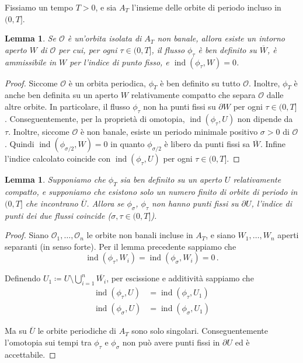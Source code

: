 \documentclass[a4paper, 11pt]{article}
\theoremstyle{definition}
\theoremstyle{plain}
\newtheorem{Lemma}[Def]{Lemma}
\newcommand{\OO}{\mathcal{O}}
\newcommand{\cl}[1]{\overline{#1}}
\newcommand{\deff}{\coloneqq}
\DeclareMathOperator{\ind}{ind}
\begin{document}
Fissiamo un tempo $T > 0$, e sia $A_T$ l'insieme delle orbite di periodo incluso in $(0,T]$.
\begin{Lemma}
	Se $\OO$ è un'orbita isolata di $A_T$ non banale, allora esiste un intorno aperto $W$ di $\OO$ per cui, per ogni $\tau \in (0,T]$, il flusso $\phi_\tau$ è ben definito su $\cl{W}$, è ammissibile in $W$ per l'indice di punto fisso, e $\ind(\phi_\tau,W) = 0$.
\end{Lemma}
\begin{proof}
	Siccome $\OO$ è un orbita periodica, $\phi_T$ è ben definito su tutto $\OO$. Inoltre, $\phi_T$ è anche ben definita su un aperto $W$ relativamente compatto che separa $\OO$ dalle altre orbite. In particolare, il flusso $\phi_\tau$ non ha punti fissi su $\partial W$ per ogni $\tau \in (0,T]$. Conseguentemente, per la proprietà di omotopia, $\ind(\phi_\tau,U)$ non dipende da $\tau$. Inoltre, siccome $\OO$ è non banale, esiste un periodo minimale positivo $\sigma > 0$ di $\OO$. Quindi $\ind(\phi_{\sigma/2}, W) = 0$ in quanto $\phi_{\sigma/2}$ è libero da punti fissi sa $\overline{W}$. Infine l'indice calcolato coincide con $\ind(\phi_\tau,U)$ per ogni $\tau \in (0,T]$.
\end{proof}
\begin{Lemma}
	Supponiamo che $\phi_T$ sia ben definito su un aperto $U$ relativamente compatto, e supponiamo che esistono solo un numero finito di orbite di periodo in $(0,T]$ che incontrano $\cl{U}$. Allora se $ \phi_\sigma$, $\phi_\tau$ non hanno punti fissi su $\partial U$, l'indice di punti dei due flussi coincide ($\sigma, \tau \in (0,T]$).
\end{Lemma}
\begin{proof}
	Siano $\OO_1, \dots, \OO_n$ le orbite non banali incluse in $A_T$, e siano $W_1, \dots, W_n$ aperti separanti (in senso forte). Per il lemma precedente sappiamo che 
	\[
		\ind(\phi_\tau, W_i) = \ind(\phi_\sigma, W_i) = 0\,.
	\]
	
	Definendo $U_1 \deff U \setminus \bigcup_{i= 1}^n \cl{W_i}$, per escissione e additività  sappiamo che 
	\[
	\begin{split}
		\ind(\phi_\tau, U) &= \ind(\phi_\tau, U_1)\\
		\ind(\phi_\sigma, U) &= \ind(\phi_\sigma, U_1)
	\end{split}
	\]
	
	Ma su $\cl{U}$ le orbite periodiche di $A_T$ sono solo singolari. Conseguentemente l'omotopia sui tempi tra $\phi_\tau$ e $\phi_\sigma$ non può avere punti fissi in $\partial U$ ed è accettabile.
\end{proof}

\printbibliography
\end{document}
